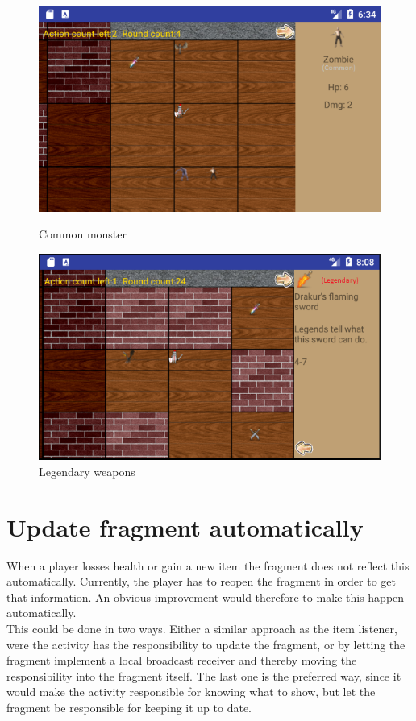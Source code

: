 \begin{figure}[ht!]
	\centering
	\begin{minipage}[b]{0.48\textwidth}
		\includegraphics[width=\textwidth]{images/ClassImprovementCommon.png}
		\caption{Common monster}
		\label{fig:classTypeCommon}
	\end{minipage}
	\hfill
	\begin{minipage}[b]{0.48\textwidth}
		\includegraphics[width=\textwidth]{images/ClassImprovementLegendary.png}
		\caption{Legendary weapons}
		\label{fig:classTypeLegendary}
	\end{minipage}
\end{figure}

\section{Update fragment automatically}
When a player losses health or gain a new item the fragment does not reflect this automatically. Currently, the player has to reopen the fragment in order to get that information. An obvious improvement would therefore to make this happen automatically.\\
This could be done in two ways. Either a similar approach as the item listener, were the activity has the responsibility to update the fragment, or by letting the fragment implement a local broadcast receiver and thereby moving the responsibility into the fragment itself. The last one is the preferred way, since it would make the activity responsible for knowing what to show, but let the fragment be responsible for keeping it up to date.

